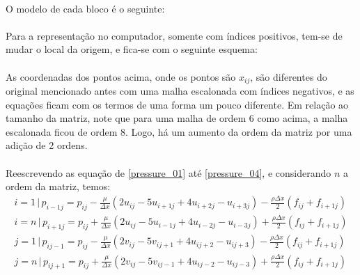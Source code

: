 \documentclass[poisson.tex]{subfiles}
\begin{document}
\paragraph{} O modelo de cada bloco é o seguinte:


\paragraph{} Para a representação no computador, somente com índices positivos, tem-se de mudar o local da origem, e fica-se com o seguinte esquema:
\esquemaUm

\paragraph{} As coordenadas dos pontos acima, onde os pontos são $x_{ij}$, são diferentes do original mencionado antes com uma malha escalonada com índices negativos, e as equações ficam com os termos de uma forma um pouco diferente. Em relação ao tamanho da matriz, note que para uma malha de ordem 6 como acima, a malha escalonada ficou de ordem 8. Logo, há um aumento da ordem da matriz por uma adição de 2 ordens.

\paragraph{} Reescrevendo as equação de \ref{pressure_01} até \ref{pressure_04}, e considerando $n$ a ordem da matriz, temos:
\begin{eqnarray}
i=1 \,|\, p_{i-1j}=p_{ij}-\frac{\mu}{\Delta x}\left(2u_{ij}-5u_{i+1j}+4u_{i+2j}-u_{i+3j}\right)-\frac{\rho\Delta x}{2}(f_{ij}+f_{i+1j})\\
i=n \,|\, p_{i+1j}=p_{ij}+\frac{\mu}{\Delta x}\left(2u_{ij}-5u_{i-1j}+4u_{i-2j}-u_{i-3j}\right)+\frac{\rho\Delta x}{2}(f_{ij}+f_{i+1j})\\
j=1 \,|\, p_{ij-1}=p_{ij}-\frac{\mu}{\Delta x}\left(2v_{ij}-5v_{ij+1}+4u_{ij+2}-u_{ij+3}\right)-\frac{\rho\Delta x}{2}(f_{ij}+f_{i+1j})\\
j=n \,|\, p_{ij+1}=p_{ij}+\frac{\mu}{\Delta x}\left(2v_{ij}-5v_{ij-1}+4u_{ij-2}-u_{ij-3}\right)+\frac{\rho\Delta x}{2}(f_{ij}+f_{i+1j})
\end{eqnarray}
\end{document}
